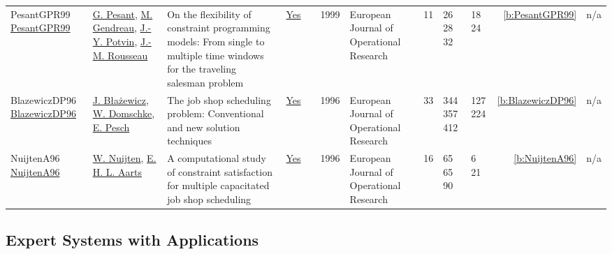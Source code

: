 {\begin{longtable}{>{\raggedright\arraybackslash}p{3cm}>{\raggedright\arraybackslash}p{4.5cm}>{\raggedright\arraybackslash}p{6.0cm}rrrp{2.5cm}rp{1cm}p{1cm}rr}
PesantGPR99 \href{http://dx.doi.org/10.1016/s0377-2217(98)00248-3}{PesantGPR99} & \hyperref[auth:a8]{G. Pesant}, \hyperref[auth:a616]{M. Gendreau}, \hyperref[auth:a1203]{J.-Y. Potvin}, \hyperref[auth:a1204]{J.-M. Rousseau} & On the flexibility of constraint programming models: From single to multiple time windows for the traveling salesman problem & \href{../works/PesantGPR99.pdf}{Yes} & \cite{PesantGPR99} & 1999 & European Journal of Operational Research & 11 & 26 28 32 & 18 24 & \ref{b:PesantGPR99} & n/a\\
BlazewiczDP96 \href{http://dx.doi.org/10.1016/0377-2217(95)00362-2}{BlazewiczDP96} & \hyperref[auth:a976]{J. Błażewicz}, \hyperref[auth:a977]{W. Domschke}, \hyperref[auth:a438]{E. Pesch} & The job shop scheduling problem: Conventional and new solution techniques & \href{../works/BlazewiczDP96.pdf}{Yes} & \cite{BlazewiczDP96} & 1996 & European Journal of Operational Research & 33 & 344 357 412 & 127 224 & \ref{b:BlazewiczDP96} & n/a\\
NuijtenA96 \href{http://dx.doi.org/10.1016/0377-2217(95)00354-1}{NuijtenA96} & \hyperref[auth:a656]{W. Nuijten}, \hyperref[auth:a777]{E. H. L. Aarts} & A computational study of constraint satisfaction for multiple capacitated job shop scheduling & \href{../works/NuijtenA96.pdf}{Yes} & \cite{NuijtenA96} & 1996 & European Journal of Operational Research & 16 & 65 65 90 & 6 21 & \ref{b:NuijtenA96} & n/a\\
\end{longtable}
}

\subsection{Expert Systems with Applications}


